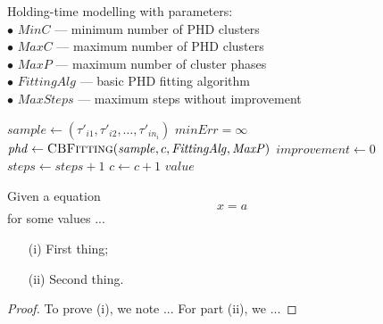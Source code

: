 \begin{algorithm}[t]
	\caption{Holding-time modelling with parameters:\\ \hspace*{3mm}$\bullet$ $\mathit{MinC}$ --- minimum number of PHD clusters\\ \hspace*{3mm}$\bullet$ $\mathit{MaxC}$ --- maximum number of PHD clusters\\ \hspace*{3mm}$\bullet$ $\mathit{MaxP}$ --- maximum number of cluster phases\\ \hspace*{3mm}$\bullet$ $\mathit{FittingAlg}$ --- basic PHD fitting algorithm\\ \hspace*{3mm}$\bullet$ $\mathit{MaxSteps}$ --- maximum steps without improvement \label{alg:example}}
	
	\begin{algorithmic}[1]
		\State $\mathit{sample}\gets (\tau'_{i1},\tau'_{i2},\ldots,\tau'_{in_i})$
		\State $\mathit{minErr}=\infty$
		\State $\mathit{phd} \gets \textsc{CBFitting}(\mathit{sample}, c, \mathit{FittingAlg}, \mathit{MaxP})$
		\State $\mathit{improvement} \gets 0$
		\Else
		\State $\mathit{steps} \gets \mathit{steps}+1$
		\EndIf
		\State $c \gets c+1$
		\EndWhile
		\State \Return $\mathit{value}$
		\EndFunction
	\end{algorithmic}
\end{algorithm}




\begin{theorem}
	\label{th:example}
	Given a equation
	\begin{equation}
		\label{eq:th1}
		x = a
	\end{equation}
	for some values ...
	\begin{itemize}
		\item[(i)] First thing;
		\item[(ii)] Second thing.
	\end{itemize}
\end{theorem}
\begin{proof}
	To prove (i), we note ...
	For part (ii), we ...
\end{proof}
